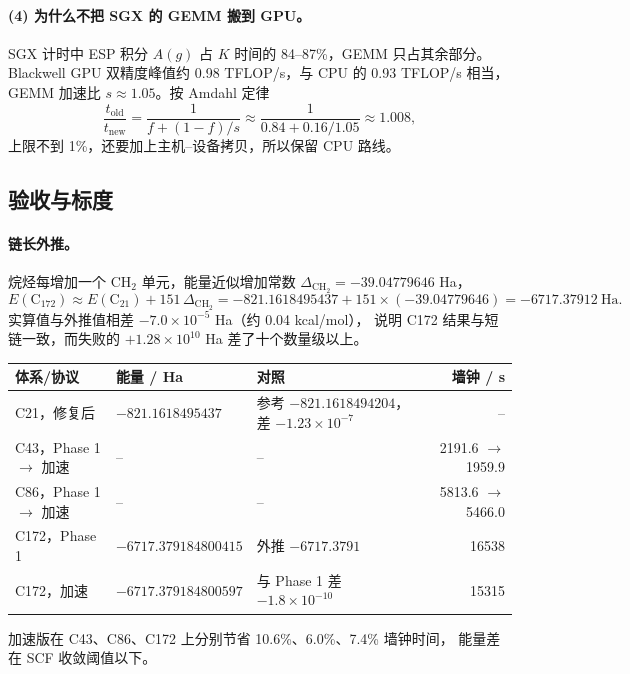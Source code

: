 \paragraph{(4) 为什么不把 SGX 的 GEMM 搬到 GPU。}
SGX 计时中 ESP 积分 \(A(g)\) 占 \(K\) 时间的 84--87\%，GEMM 只占其余部分。
Blackwell GPU 双精度峰值约 0.98 TFLOP/s，与 CPU 的 0.93 TFLOP/s 相当，
GEMM 加速比 \(s\approx1.05\)。按 Amdahl 定律
\begin{equation}
\frac{t_{\mathrm{old}}}{t_{\mathrm{new}}}
=\frac{1}{f+(1-f)/s}
\approx\frac{1}{0.84+0.16/1.05}\approx1.008 ,
\end{equation}
上限不到 1\%，还要加上主机--设备拷贝，所以保留 CPU 路线。

\subsection{验收与标度}
\label{sec:repair-validation}
\paragraph{链长外推。}
烷烃每增加一个 CH\(_2\) 单元，能量近似增加常数
\(\Delta_{\mathrm{CH_2}}=-39.04779646\) Ha，
\begin{equation}
E(\mathrm C_{172})\approx E(\mathrm C_{21})+151\,\Delta_{\mathrm{CH_2}}
=-821.1618495437+151\times(-39.04779646)
=-6717.37912\ \mathrm{Ha}.
\end{equation}
实算值与外推值相差 \(-7.0\times10^{-5}\) Ha（约 0.04 kcal/mol），
说明 C172 结果与短链一致，而失败的 \(+1.28\times10^{10}\) Ha 差了十个数量级以上。

\begin{center}
\small
\begin{tabular}{p{3.1cm}p{3.6cm}p{5.2cm}r}
\toprule
体系/协议 & 能量 / Ha & 对照 & 墙钟 / s\\
\midrule
C21，修复后 & \(-821.1618495437\) & 参考 \(-821.1618494204\)，差 \(-1.23\times10^{-7}\) & --\\
C43，Phase 1 \(\to\) 加速 & -- & -- & 2191.6 \(\to\) 1959.9\\
C86，Phase 1 \(\to\) 加速 & -- & -- & 5813.6 \(\to\) 5466.0\\
C172，Phase 1 & \(-6717.379184800415\) & 外推 \(-6717.3791\) & 16538\\
C172，加速 & \(-6717.379184800597\) & 与 Phase 1 差 \(-1.8\times10^{-10}\) & 15315\\
\bottomrule
\end{tabular}
\end{center}
加速版在 C43、C86、C172 上分别节省 10.6\%、6.0\%、7.4\% 墙钟时间，
能量差在 SCF 收敛阈值以下。

